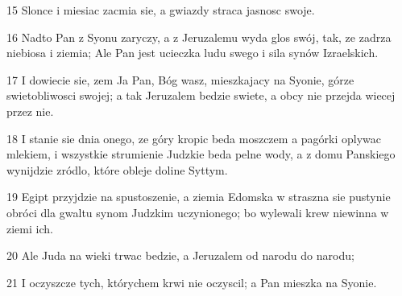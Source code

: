 \par 15 Slonce i miesiac zacmia sie, a gwiazdy straca jasnosc swoje.
\par 16 Nadto Pan z Syonu zaryczy, a z Jeruzalemu wyda glos swój, tak, ze zadrza niebiosa i ziemia; Ale Pan jest ucieczka ludu swego i sila synów Izraelskich.
\par 17 I dowiecie sie, zem Ja Pan, Bóg wasz, mieszkajacy na Syonie, górze swietobliwosci swojej; a tak Jeruzalem bedzie swiete, a obcy nie przejda wiecej przez nie.
\par 18 I stanie sie dnia onego, ze góry kropic beda moszczem a pagórki oplywac mlekiem, i wszystkie strumienie Judzkie beda pelne wody, a z domu Panskiego wynijdzie zródlo, które obleje doline Syttym.
\par 19 Egipt przyjdzie na spustoszenie, a ziemia Edomska w straszna sie pustynie obróci dla gwaltu synom Judzkim uczynionego; bo wylewali krew niewinna w ziemi ich.
\par 20 Ale Juda na wieki trwac bedzie, a Jeruzalem od narodu do narodu;
\par 21 I oczyszcze tych, którychem krwi nie oczyscil; a Pan mieszka na Syonie.


